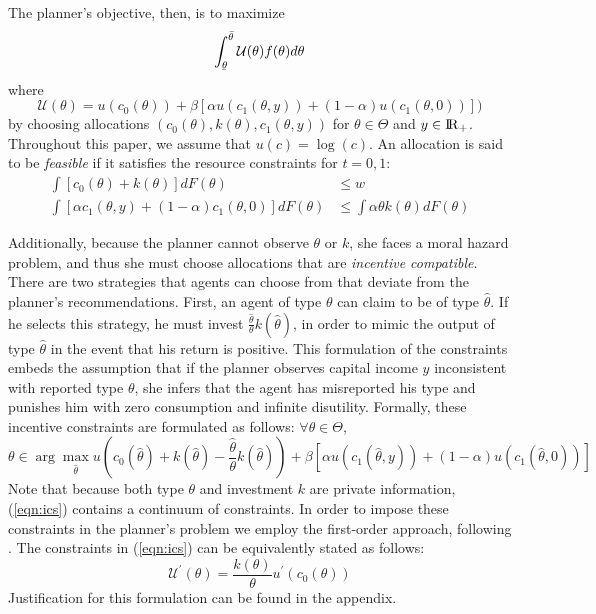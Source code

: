 \documentclass[11pt]{article}
\newcommand{\ubar}[1]{\underaccent{\bar}{#1}}
\newcommand{\p}{\prime}
\newcommand{\R}{{\rm I\!R}}
\newcommand{\U}{\mathcal{U}}
\begin{document}
The planner's objective, then, is to maximize
\begin{equation}
    \int_{\ubar{\theta}}^{\bar{\theta}}\U(\theta)f(\theta)d\theta \label{eqn:plan_obj}
\end{equation}
where 
\begin{equation}
    \U(\theta) = u\left(c_{0}\left(\theta\right)\right)+\beta\left[\alpha u\left(c_{1}\left(\theta,y\right)\right)+\left(1-\alpha\right)u\left(c_{1}\left(\theta,0\right)\right)\right]) \label{eqn:pkc}
\end{equation}
by choosing allocations \( \left( c_0(\theta),k(\theta) ,c_1(\theta,y) \right)\) for \( \theta\in\Theta \) and \( y\in\R_+ \). Throughout this paper, we assume that \( u(c) = \log(c) \). An allocation is said to be \textit{feasible} if it satisfies the resource constraints for \( t=0,1 \):
\begin{align}
    \int\left[c_{0}\left(\theta\right)+k\left(\theta\right)\right]dF\left(\theta\right)&\le w \label{eqn:rc0} \\
    \int\left[\alpha c_{1}\left(\theta,y\right)+\left(1-\alpha\right)c_{1}\left(\theta,0\right)\right]dF\left(\theta\right) &\le \int\alpha\theta k\left(\theta\right)dF\left(\theta\right) \label{eqn:rc1}
\end{align}

Additionally, because the planner cannot observe \( \theta \) or \( k \), she faces a moral hazard problem, and thus she must choose allocations that are \textit{incentive compatible}. There are two strategies that agents can choose from that deviate from the planner's recommendations. First, an agent of type \( \theta \) can claim to be of type \( \hat{\theta} \). If he selects this strategy, he must invest \( \frac{\hat{\theta}}{\theta}k\left( \hat{\theta} \right) \), in order to mimic the output of type \( \hat{\theta} \) in the event that his return is positive. This formulation of the constraints embeds the assumption that if the planner observes capital income \( y \) inconsistent with reported type \( \theta \), she infers that the agent has misreported his type and punishes him with zero consumption and infinite disutility. Formally, these incentive constraints are formulated as follows: \( \forall \theta\in\Theta \),
\begin{equation}
    \theta\in\arg\max_{\hat{\theta}}u\left(c_{0}\left(\hat{\theta}\right)+k\left(\hat{\theta}\right)-\frac{\hat{\theta}}{\theta}k\left(\hat{\theta}\right)\right)+\beta\left[\alpha u\left(c_{1}\left(\hat{\theta},y\right)\right)+\left(1-\alpha\right)u\left(c_{1}\left(\hat{\theta},0\right)\right)\right]\label{eqn:ics}
\end{equation}
Note that because both type \( \theta \) and investment \( k \) are private information, (\ref{eqn:ics}) contains a continuum of constraints. In order to impose these constraints in the planner's problem we employ the first-order approach, following \cite{jewitt1988justifying}. The constraints in (\ref{eqn:ics}) can be equivalently stated as follows:
\begin{equation}
    \U^\p(\theta) = \frac{k(\theta)}{\theta}u^\p\left( c_0(\theta) \right) \label{eqn:ic_t}
\end{equation}
Justification for this formulation can be found in the appendix. 
 
\end{document}
